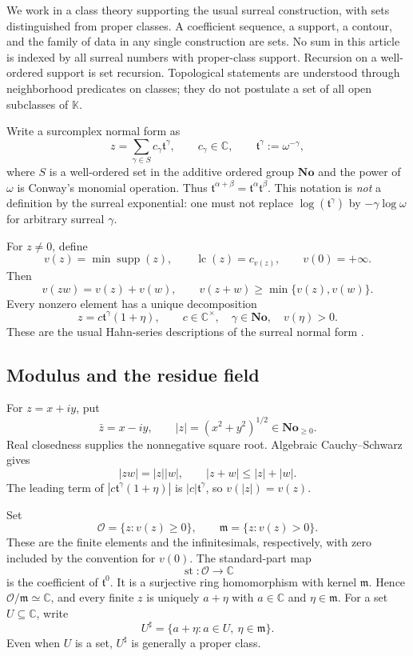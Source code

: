 \documentclass[11pt,a4paper]{article}
\numberwithin{equation}{section}
\theoremstyle{definition}
\newcommand{\No}{\mathbf{No}}
\newcommand{\K}{\mathbb K}
\newcommand{\C}{\mathbb C}
\newcommand{\tmon}{\mathfrak t}
\newcommand{\OO}{\mathcal O}
\newcommand{\mm}{\mathfrak m}
\newcommand{\st}{\operatorname{st}}
\newcommand{\supp}{\operatorname{supp}}
\newcommand{\lc}{\operatorname{lc}}
\begin{document}
We work in a class theory supporting the usual surreal construction, with
sets distinguished from proper classes. A coefficient sequence, a support,
a contour, and the family of data in any single construction are sets.
No sum in this article is indexed by all surreal numbers with proper-class
support. Recursion on a well-ordered support is set recursion. Topological
statements are understood through neighborhood predicates on classes; they do
not postulate a set of all open subclasses of $\K$.

Write a surcomplex normal form as
\begin{equation}\label{eq:normal}
 z=\sum_{\gamma\in S}c_\gamma\tmon^\gamma,
 \qquad c_\gamma\in\C,\qquad
 \tmon^\gamma:=\omega^{-\gamma},
\end{equation}
where $S$ is a well-ordered set in the additive ordered group $\No$ and the
power of $\omega$ is Conway's monomial operation. Thus
$\tmon^{\alpha+\beta}=\tmon^\alpha\tmon^\beta$.
This notation is \emph{not} a definition by the surreal exponential:
one must not replace $\log(\tmon^\gamma)$ by
$-\gamma\log\omega$ for arbitrary surreal $\gamma$.

For $z\neq0$, define
\[
 v(z)=\min\supp(z),\qquad \lc(z)=c_{v(z)},\qquad v(0)=+\infty.
\]
Then
\begin{equation}\label{eq:valrules}
 v(zw)=v(z)+v(w),\qquad
 v(z+w)\geq\min\{v(z),v(w)\}.
\end{equation}
Every nonzero element has a unique decomposition
\begin{equation}\label{eq:leadingunit}
 z=c\tmon^\gamma(1+\eta),\qquad
 c\in\C^\times,\quad\gamma\in\No,\quad v(\eta)>0.
\end{equation}
These are the usual Hahn-series descriptions of the surreal normal form
\cite{Alling,BMder}.

\subsection{Modulus and the residue field}

For $z=x+iy$, put
\[
 \bar z=x-iy,\qquad |z|=(x^2+y^2)^{1/2}\in\No_{\geq0}.
\]
Real closedness supplies the nonnegative square root. Algebraic
Cauchy--Schwarz gives
\[
 |zw|=|z||w|,\qquad |z+w|\leq|z|+|w|.
\]
The leading term of $|c\tmon^\gamma(1+\eta)|$ is
$|c|\tmon^\gamma$, so $v(|z|)=v(z)$.

Set
\[
 \OO=\{z:v(z)\geq0\},\qquad
 \mm=\{z:v(z)>0\}.
\]
These are the finite elements and the infinitesimals, respectively, with zero
included by the convention for $v(0)$. The standard-part map
\[
 \st:\OO\longrightarrow\C
\]
is the coefficient of $\tmon^0$. It is a surjective ring homomorphism with
kernel $\mm$. Hence $\OO/\mm\simeq\C$, and every finite $z$ is uniquely
$a+\eta$ with $a\in\C$ and $\eta\in\mm$.
For a set $U\subseteq\C$, write
\[
 U^\sharp=\{a+\eta:a\in U,\ \eta\in\mm\}.
\]
Even when $U$ is a set, $U^\sharp$ is generally a proper class.
\end{document}
